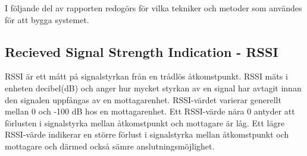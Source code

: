 \documentclass[a4paper,12pt]{article}
\begin{document}

 I följande del av rapporten redogörs för vilka tekniker och metoder som användes för att bygga systemet.

 \subsection{Recieved Signal Strength Indication - RSSI}\label{RSSI}
 RSSI är ett mått på signalstyrkan från en trådlös åtkomstpunkt. RSSI mäts i enheten decibel(dB) och anger hur mycket styrkan av en signal har avtagit innan den signalen uppfångas av en mottagarenhet. RSSI-värdet varierar generellt mellan 0 och -100 dB hos en mottagarenhet. Ett RSSI-värde nära 0 antyder att förlusten i signalstyrka mellan åtkomstpunkt och mottagare är låg. Ett lägre RSSI-värde indikerar en större förlust i signalstyrka mellan åtkomstpunkt och mottagare och därmed också sämre anslutningsmöjlighet.
\end{document}

